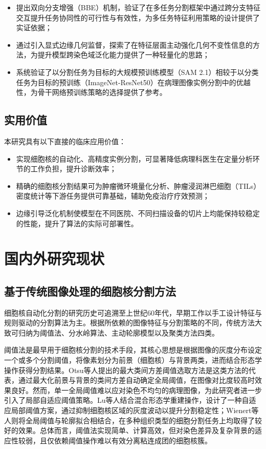 \documentclass{sufethesismas}
\begin{document}
\begin{itemize}
  \item 提出双向分支增强（BBE）机制，验证了在多任务分割框架中通过跨分支特征交互提升任务协同性的可行性与有效性，为多任务特征利用策略的设计提供了实证依据；
  \item 通过引入显式边缘几何监督，探索了在特征层面主动强化几何不变性信息的方法，为提升模型跨染色域泛化能力提供了一种轻量化的思路；
  \item 系统验证了以分割任务为目标的大规模预训练模型（SAM 2.1）相较于以分类任务为目标的预训练（ImageNet-ResNet50）在病理图像实例分割中的优越性，为骨干网络预训练策略的选择提供了参考。
\end{itemize}

\section{实用价值}

本研究具有以下直接的临床应用价值：

\begin{itemize}
  \item 实现细胞核的自动化、高精度实例分割，可显著降低病理科医生在定量分析环节的工作负担，提升诊断效率；
  \item 精确的细胞核分割结果可为肿瘤微环境量化分析、肿瘤浸润淋巴细胞（TILs）密度统计等下游任务提供可靠基础，辅助免疫治疗疗效预测；
  \item 边缘引导泛化机制使模型在不同医院、不同扫描设备的切片上均能保持较稳定的性能，提升了算法的实际可部署性。
\end{itemize}


\chapter{国内外研究现状}

\section{基于传统图像处理的细胞核分割方法}

细胞核自动化分割的研究历史可追溯至上世纪60年代，早期工作以手工设计特征与规则驱动的分割算法为主。根据所依赖的图像特征与分割策略的不同，传统方法大致可归纳为阈值法、分水岭算法、主动轮廓模型以及聚类方法四类。

阈值法是最早用于细胞核分割的技术手段，其核心思想是根据图像的灰度分布设定一个或多个分割阈值，将像素划分为前景（细胞核）与背景两类，进而结合形态学操作获得分割结果。Otsu等人\cite{Otsu1979}提出的最大类间方差阈值选取方法是这类方法的代表，通过最大化前景与背景的类间方差自动确定全局阈值，在图像对比度较高时效果良好。然而，单一全局阈值难以应对染色不均匀的病理图像，为此研究者进一步引入了局部自适应阈值策略。Lu等人\cite{Lu2012}结合混合形态学重建操作，设计了一种自适应局部阈值方案，通过抑制细胞核区域的灰度波动以提升分割稳定性；Wienert等人\cite{Wienert2012}则将全局阈值与轮廓拟合相结合，在多种组织类型的细胞分割任务上均取得了较好的效果。总体而言，阈值法实现简单、计算高效，但对染色差异及复杂背景的适应性较弱，且仅依赖阈值操作难以有效分离粘连成团的细胞核簇。
\end{document}
